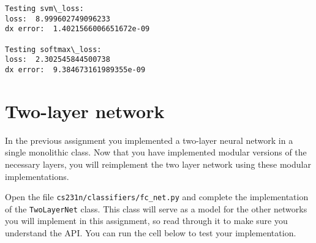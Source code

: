 \documentclass[11pt]{article}
\begin{document}
    \begin{Verbatim}[commandchars=\\\{\}]
Testing svm\_loss:
loss:  8.999602749096233
dx error:  1.4021566006651672e-09

Testing softmax\_loss:
loss:  2.302545844500738
dx error:  9.384673161989355e-09
    \end{Verbatim}

    \hypertarget{two-layer-network}{%
\section{Two-layer network}\label{two-layer-network}}

In the previous assignment you implemented a two-layer neural network in
a single monolithic class. Now that you have implemented modular
versions of the necessary layers, you will reimplement the two layer
network using these modular implementations.

Open the file \texttt{cs231n/classifiers/fc\_net.py} and complete the
implementation of the \texttt{TwoLayerNet} class. This class will serve
as a model for the other networks you will implement in this assignment,
so read through it to make sure you understand the API. You can run the
cell below to test your implementation.
\end{document}
